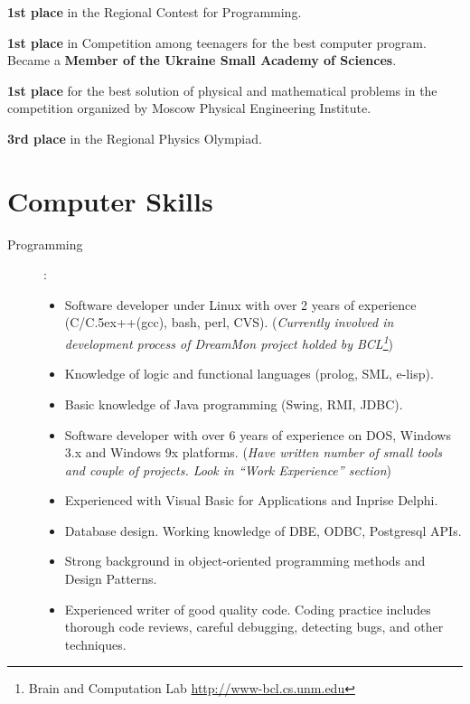 \documentclass[10pt, overlapped, line]{res}
\def\Cplusplus{{\rm C\raise.5ex\hbox{\small ++}}}
\newcommand{\mplace}[1]{{\bf #1}}
\newcommand{\wdescription}[1]{({\small \it #1})}
\begin{document}
\begin{resume}
\begin{position}
\mplace{1st place} in the Regional Contest for Programming.
\end{position}

\begin{position}
  \mplace{1st place} in Competition among teenagers for the best
  computer program. Became a \mplace{Member of the Ukraine Small Academy
    of Sciences}.
\end{position}

\begin{position}
  \mplace{1st place} for the best solution of physical and mathematical
  problems in the competition organized by Moscow Physical Engineering Institute.
\end{position}

\begin{position}
  \mplace{3rd place} in the Regional Physics Olympiad.
\end{position}


\section{Computer Skills}
 \begin{description}
   \item[Programming]:\\
     \begin{itemize}

     \item Software developer under Linux with over 2 years of
       experience (C/\Cplusplus(gcc), bash, perl, CVS). 
       \wdescription{Currently involved in development process of
       DreamMon project holded by BCL\footnote{ Brain and Computation
       Lab \href{URL}{http://www-bcl.cs.unm.edu}}}

     \item Knowledge of logic and functional languages (prolog, SML, e-lisp).
     \item Basic knowledge of Java programming (Swing, RMI, JDBC).
     \item Software developer with over 6 years of experience on DOS,
       Windows 3.x and Windows 9x platforms.
       \wdescription{Have written number of small tools and couple of
       projects. Look in ``Work Experience'' section}
     \item Experienced with Visual Basic for Applications and Inprise
       Delphi.
     \item Database design. Working knowledge of DBE, ODBC, Postgresql
       APIs. 
     \item Strong background in object-oriented programming methods
       and Design Patterns.
     \item Experienced writer of good quality code. Coding practice
       includes thorough code reviews, careful debugging, detecting
       bugs, and other techniques.
     \end{itemize} 


\end{description}
\end{resume}
\end{document}
